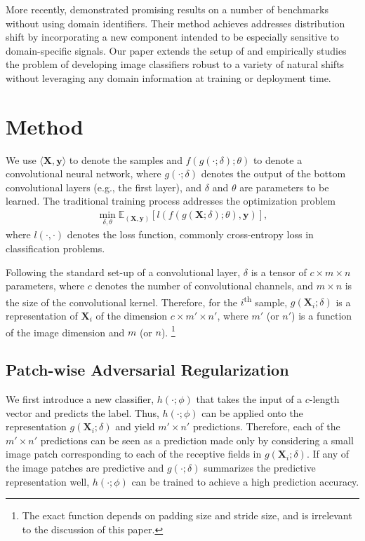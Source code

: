 \documentclass{article}
\begin{document}
More recently, \citet{wang2018learning} demonstrated promising results on a number of benchmarks
without using domain identifiers.
Their method achieves addresses distribution shift
by incorporating a new component 
intended to be especially sensitive to domain-specific signals. 
Our paper extends the setup of \citep{wang2018learning} 
and empirically studies the problem of developing image classifiers robust to a variety of natural shifts
without leveraging any domain information at training or deployment time.  
\section{Method}
\label{sec:method}
We use $\langle \mathbf{X}, \mathbf{y} \rangle$ 
to denote the samples and $f(g(\cdot;\delta);\theta)$ 
to denote a convolutional neural network, 
where $g(\cdot;\delta)$ denotes the output 
of the bottom convolutional layers 
(e.g., the first layer),
and $\delta$ and $\theta$ are parameters to be learned. 
The traditional training process addresses the optimization problem
\begin{align}
    \min_{\delta, \theta} \mathbb{E}_{(\mathbf{X}, \mathbf{y})}[l(f(g(\mathbf{X};\delta);\theta), \mathbf{y})],
    \label{eq:train}
\end{align}
where $l(\cdot, \cdot)$ denotes the loss function, commonly cross-entropy loss in classification problems. 

Following the standard set-up of a convolutional layer, 
$\delta$ is a tensor of $c \times m \times n$ parameters, 
where $c$ denotes the number of convolutional channels, 
and $m \times n$ is the size of the convolutional kernel. 
Therefore, for the $i$\textsuperscript{th} sample, 
$g(\mathbf{X}_i;\delta)$ is a representation of 
$\mathbf{X}_i$ of the dimension $c \times m' \times n'$, 
where $m'$ (or $n'$) is a function of the image dimension and $m$ (or $n$). \footnote{The exact function depends on padding size and stride size, and is irrelevant to the discussion of this paper.}

\subsection{Patch-wise Adversarial Regularization}
We first introduce a new classifier, $h(\cdot; \phi)$ 
that takes the input of a $c$-length vector and predicts the label. 
Thus, $h(\cdot; \phi)$ can be applied onto 
the representation $g(\mathbf{X}_i;\delta)$ and yield $m' \times n'$ predictions. 
Therefore, each of the $m' \times n'$ predictions 
can be seen as a prediction made only by considering a small image patch 
corresponding to each of the receptive fields in $g(\mathbf{X}_i;\delta)$. 
If any of the image patches are predictive and $g(\cdot;\delta)$
summarizes the predictive representation well, 
$h(\cdot; \phi)$ can be trained to achieve a high prediction accuracy. 
\end{document}
